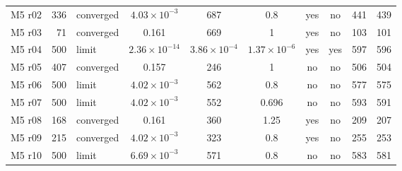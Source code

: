 {\begin{longtable}{lrlcccccrr}
M5 r02 & 336 & converged & $4.03\times 10^{-3}$ & 687 & 0.8 & yes & no & 441 & 439 \\
M5 r03 & 71 & converged & 0.161 & 669 & 1 & yes & no & 103 & 101 \\
M5 r04 & 500 & limit & $2.36\times 10^{-14}$ & $3.86\times 10^{-4}$ & $1.37\times 10^{-6}$ & yes & yes & 597 & 596 \\
M5 r05 & 407 & converged & 0.157 & 246 & 1 & no & no & 506 & 504 \\
M5 r06 & 500 & limit & $4.02\times 10^{-3}$ & 562 & 0.8 & no & no & 577 & 575 \\
M5 r07 & 500 & limit & $4.02\times 10^{-3}$ & 552 & 0.696 & no & no & 593 & 591 \\
M5 r08 & 168 & converged & 0.161 & 360 & 1.25 & yes & no & 209 & 207 \\
M5 r09 & 215 & converged & $4.02\times 10^{-3}$ & 323 & 0.8 & yes & no & 255 & 253 \\
M5 r10 & 500 & limit & $6.69\times 10^{-3}$ & 571 & 0.8 & no & no & 583 & 581 \\
\end{longtable}
}
